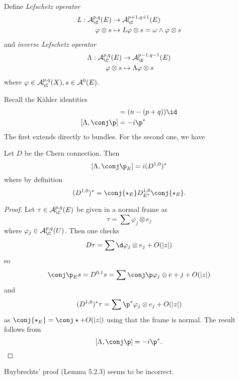 \documentclass[a4paper]{article}
\newcommand{\w}{\wedge} %
\begin{document}
\begin{definition}
  Define \emph{Lefschetz operator}
  \begin{align*}
    L: \mathcal A^{p, q}_\C(E) &\to \mathcal A^{p + 1, q + 1}_\C(E) \\
    \varphi \otimes s &\mapsto L\varphi \otimes s = \omega \w \varphi \otimes s
  \end{align*}
  and \emph{inverse Lefschetz operator}
  \begin{align*}
    \Lambda: \mathcal A^{p, q}_\C(E) &\to \mathcal A^{p - 1, q - 1}_\E(E) \\
    \varphi \otimes s &\mapsto \Lambda \varphi \otimes s
  \end{align*}
  where \(\varphi \in \mathcal A^{p, q}_\C(X), s \in \mathcal A^0(E)\).
\end{definition}

Recall the Kähler identities
\begin{align*}
  [\Lambda, L] &= (n - (p + q)) \id \\
  [\Lambda, \conj \p] &= -i \p^*
\end{align*}
The first extends directly to bundles. For the second one, we have

\begin{lemma}
  Let \(D\) be the Chern connection. Then
  \[
    [\Lambda, \conj \p_E] = i (D^{1, 0})^*
  \]
  where by definition
  \[
    (D^{1, 0})^* = \conj{\star_E} D^{1, 0}_{E^*} \conj{\star_E}.
  \]
\end{lemma}

\begin{proof}
  Let \(\tau \in \mathcal A^{p, q}_\C(E)\) be given in a normal frame as
  \[
    \tau = \sum \varphi_j \otimes e_j
  \]
  where \(\varphi_j \in \mathcal A^{p, q}_\C(U)\). Then one checks
  \[
    D\tau = \sum \d \varphi_j \otimes e_j + O(|z|)
  \]
  so
  \[
    \conj \p_E s = D^{0, 1}s = \sum \conj \p \varphi_j \otimes e+j + O(|z|)
  \]
  and
  \[
    (D^{1, 0})^* \tau = \sum \p^* \varphi_j \otimes e_j + O(|z|)
  \]
  as \(\conj{\star_E} = \conj \star + O(|z|)\) using that the frame is normal. The result follows from
  \[
    [\Lambda, \conj \p] = -i\p^*.
  \]
\end{proof}

\begin{remark}
  Huybrechts' proof (Lemma 5.2.3) seems to be incorrect.
\end{remark}
\end{document}
